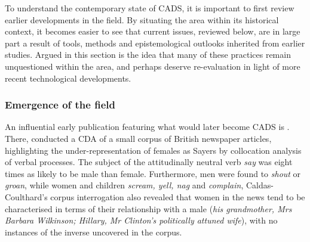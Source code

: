
To understand the contemporary state of \gls{CADS}, it is important to first review earlier developments in the field. By situating the area within its historical context, it becomes easier to see that current issues, reviewed below, are in large part a result of tools, methods and epistemological outlooks inherited from earlier studies. Argued in this section is the idea that many of these practices remain unquestioned within the area, and perhaps deserve re\hyp{}evaluation in light of more recent technological developments.

\subsubsection{Emergence of the field}

An influential early publication featuring what would later become \gls{CADS} is \textcite*{fox_techniques_1993}. There, \textcite{caldas-coulthard_discourse_1993} conducted a \gls{CDA} of a small \gls{corpus} of British newspaper articles, highlighting the under\hyp{}representation of females as Sayers by collocation analysis of verbal processes. The subject of the attitudinally neutral verb \emph{say} was eight times as likely to be male than female. Furthermore, men were found to \emph{shout} or \emph{groan}, while women and children \emph{scream, yell, nag} and \emph{complain}, Caldas-Coulthard's \gls{corpus} interrogation also revealed that women in the news tend to be characterised in terms of their relationship with a male (\emph{his grandmother, Mrs Barbara Wilkinson; Hillary, Mr Clinton's politically attuned wife}), with no instances of the inverse uncovered in the \gls{corpus}. 

